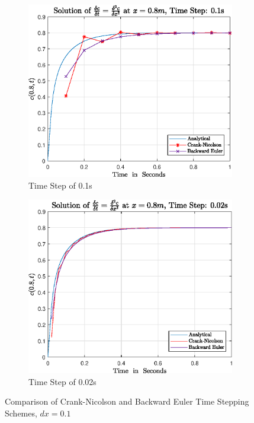 \documentclass[11pt]{article}
\begin{document}
\begin{figure}[ht] 
        \centering
        \begin{subfigure}[b]{0.475\textwidth}
            \centering
            \includegraphics[width=\textwidth]{epsQ1bdt05}
            \caption[]%
            {{\small Time Step of 0.1s }}    
            \label{fig:q1b10}
        \end{subfigure}
        \hfill
        \begin{subfigure}[b]{0.475\textwidth}  
            \centering 
            \includegraphics[width=\textwidth]{epsQ1bdt025}
            \caption[]%
            {{\small Time Step of 0.02s}}    
            \label{fig:q1b025}
        \end{subfigure}
        \caption[ Comparison of Time Stepping Schemes ]
        {\small Comparison of Crank-Nicolson and Backward Euler Time Stepping Schemes, $dx = 0.1$} 
        \label{fig:q1b}
\end{figure}
\end{document}
